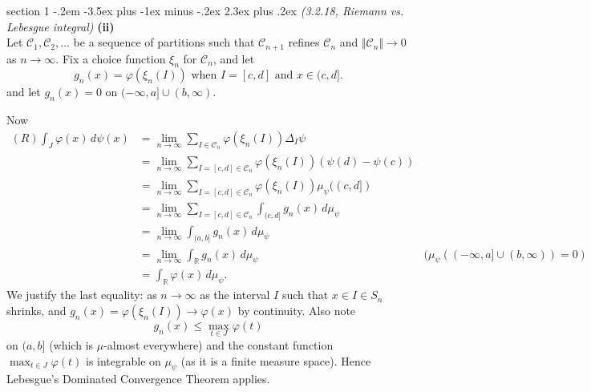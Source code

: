 \documentclass[12pt]{article}
\makeatletter
\theoremstyle{norm}
\newcommand{\R}[0]{\mathbb{R}}
\providecommand{\cal}[1]{\mathcal{#1}}
\renewcommand{\cal}[1]{\mathcal{#1}}
\newcommand{\De}[0]{\Delta}
\newcommand{\ph}[0]{\varphi}
\newcommand{\subprob}[1]{\noindent\textbf{#1}\\}
\newcommand{\iy}[0]{\infty}
\newenvironment{problem}{\@startsection
       {section}
       {1}
       {-.2em}
       {-3.5ex plus -1ex minus -.2ex}
       {2.3ex plus .2ex}
       {\pagebreak[3]%
       \large\bf\noindent{Problem }
       }
       }
       {%
       }
\makeatother
\begin{document}
\begin{problem}{\it(3.2.18, Riemann vs. Lebesgue integral)}
\subprob{(ii)}
Let $\cal C_1,\cal C_2,\ldots$ be a sequence of partitions such that $\cal C_{n+1}$ refines $\cal C_n$ and $\Vert \cal C_n\Vert\to 0$ as $n\to \iy$. %
Fix a choice function $\xi_n$ for $\cal C_n$, and let
\[
g_n(x)=\ph(\xi_n(I))\text{ when }I=[c,d]\text{ and }x\in (c,d].
\]
and let $g_n(x)=0$ on $(-\iy,a]\cup (b,\iy)$.

Now
\begin{align*}
(R) \int_J \ph(x)\,d\psi(x) &= \lim_{n\to \iy}\sum_{I\in \cal C_n}\ph(\xi_n(I))\De_I \psi\\
&=\lim_{n\to \iy}\sum_{I=[c,d]\in \cal C_n}\ph(\xi_n(I))(\psi(d)-\psi(c))\\
&=\lim_{n\to \iy}\sum_{I=[c,d]\in \cal C_n}\ph(\xi_n(I))\mu_{\psi}((c,d])\\
&=\lim_{n\to \iy}\sum_{I=[c,d]\in \cal C_n}\int_{(c,d]} g_n(x)\, d\mu_{\psi}\\
&=\lim_{n\to \iy}\int_{(a,b]}g_n(x)\,d\mu_{\psi}\\
&=\lim_{n\to \iy}\int_{\R}g_n(x)\,d\mu_{\psi}&(\mu_{\psi}((-\iy,a]\cup (b,\iy))=0)\\
&=\int_{\R} \ph(x)\,d\mu_{\psi}.
\end{align*}
We justify the last equality: %
as $n\to \iy$ 
as the interval $I$ 
such that $x\in I\in S_n$ 
shrinks, and $g_n(x)=\ph(\xi_n(I))\to \ph(x)$ by continuity. %
Also note 
\[
g_n(x)
\le \max_{t\in J} \ph(t)
\]
on $(a,b]$ (which is $\mu$-almost everywhere) 
and the constant function $\max_{t\in J} \ph(t)$ is integrable on $\mu_{\psi}$ (as it is a finite measure space).
Hence Lebesgue's Dominated Convergence Theorem
 applies.
\end{problem}
\end{document}
